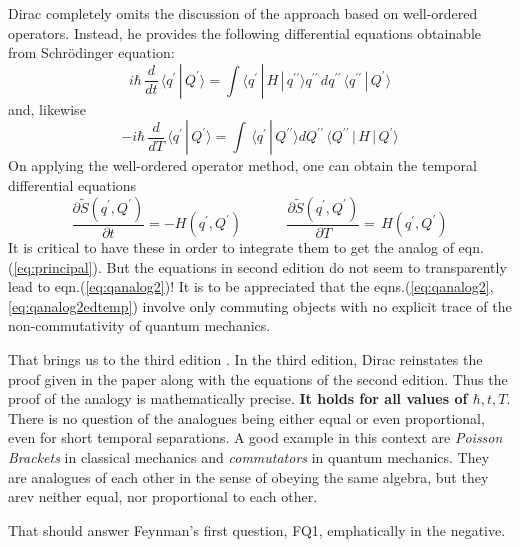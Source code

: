 \documentclass[12pt]{article}
\newcommand{\be}{\begin{equation}}
\newcommand{\ee}{\end{equation}}
\begin{document}
Dirac completely omits the discussion of the approach based on well-ordered operators. Instead, he provides the following differential equations
obtainable from Schr\"odinger equation:
\be
\label{eq:qanalog2ed}
i \hbar\,\frac{d}{dt}\,\langle q^\prime\,|\,Q^\prime\rangle =  \int  \langle q^\prime\,|\,H\,|\,q^{\prime\prime} \rangle  q^{\prime\prime}\,
dq^{\prime\prime}\, \langle q^{\prime\prime}\,|\,Q^\prime\rangle
\ee
and, likewise
\be
\label{eq:qanalog2ed2}
- i \hbar\,\frac{d}{dT}\,\langle q^\prime\,|\,Q^\prime\rangle =  \int  
\,\langle q^{\prime}\,|\,Q^{\prime\prime}\rangle
dQ^{\prime\prime}\,
\langle Q^{\prime\prime}\,|\,H\,|\,Q^\prime \rangle  
\ee
On applying the well-ordered operator method, one can obtain the temporal differential equations
\be
\frac{\partial {\tilde S}(q^\prime,Q^\prime)}{\partial t} = - H(q^\prime,Q^\prime)\quad\quad\quad\,
\frac{\partial {\tilde S}(q^\prime,Q^\prime)}{\partial T} = \,H(q^\prime,Q^\prime)
\label{eq:qanalog2edtemp}
\ee
It is critical to have these in order to integrate them to get the analog of eqn.(\ref{eq:principal}). But the equations in second edition
do not seem to transparently lead to eqn.(\ref{eq:qanalog2})! It is to be appreciated that the eqns.(\ref{eq:qanalog2}, \ref{eq:qanalog2edtemp})
involve only commuting objects with no explicit trace of the non-commutativity of quantum mechanics. 

That brings us to the third edition \cite{diracbook3}.
In the third edition, Dirac reinstates the proof given in the paper along with the equations of the second edition. Thus the proof of the 
analogy is mathematically precise. {\bf It holds for all values of $\hbar,t,T$}. There is no question of the analogues being either
equal or even proportional, even for short temporal separations. A good example in this context are \emph{Poisson Brackets} in classical
mechanics and \emph{commutators} in quantum mechanics. They are analogues of each other in the sense of obeying the same algebra, but
they arev neither equal, nor proportional to each other.

That should answer Feynman's first question, FQ1, emphatically in the negative.
\end{document}
